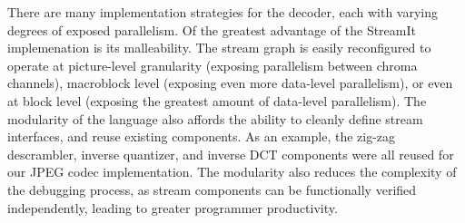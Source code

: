 There are many implementation strategies for the decoder, each with
varying degrees of exposed parallelism. Of the greatest advantage of
the StreamIt implemenation is its malleability. The stream graph is
easily reconfigured to operate at picture-level granularity (exposing
parallelism between chroma channels), macroblock level (exposing even
more data-level parallelism), or even at block level (exposing the
greatest amount of data-level parallelism). The modularity of the
language also affords the ability to cleanly define stream interfaces,
and reuse existing components. As an example, the zig-zag descrambler,
inverse quantizer, and inverse DCT components were all reused for our
JPEG codec implementation. The modularity also reduces the complexity
of the debugging process, as stream components can be functionally
verified independently, leading to greater programmer productivity.



